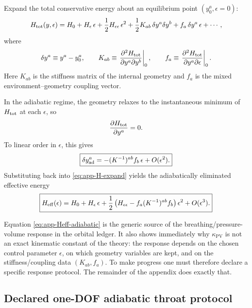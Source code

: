 \documentclass[11pt]{article}
\newcommand{\kPV}{\kappa_{\mathrm{PV}}}
\begin{document}
Expand the total conservative energy about an equilibrium point
\((y_0^a,\epsilon=0)\):
\begin{equation}
H_{\rm tot}(y,\epsilon)
=
H_0
+
H_\epsilon\,\epsilon
+
\frac12 H_{\epsilon\epsilon}\,\epsilon^2
+
\frac12 K_{ab}\,\delta y^a\delta y^b
+
f_a\,\delta y^a\,\epsilon
+\cdots,
\label{eq:app-H-expand}
\end{equation}
where
\begin{equation}
\delta y^a\equiv y^a-y_0^a,
\qquad
K_{ab}\equiv
\left.\frac{\partial^2 H_{\rm tot}}{\partial y^a\partial y^b}\right|_0,
\qquad
f_a\equiv
\left.\frac{\partial^2 H_{\rm tot}}{\partial y^a\partial \epsilon}\right|_0.
\label{eq:app-Kab-fa}
\end{equation}
Here \(K_{ab}\) is the stiffness matrix of the internal geometry and \(f_a\) is the
mixed environment--geometry coupling vector.

In the adiabatic regime, the geometry relaxes to the instantaneous minimum of
\(H_{\rm tot}\) at each \(\epsilon\), so
\begin{equation}
\frac{\partial H_{\rm tot}}{\partial y^a}=0.
\end{equation}
To linear order in \(\epsilon\), this gives
\begin{equation}
\boxed{
\delta y^a_{\rm ad}
=
-(K^{-1})^{ab}f_b\,\epsilon
+
O(\epsilon^2).
}
\label{eq:app-dy-adiabatic}
\end{equation}
Substituting back into \eqref{eq:app-H-expand} yields the adiabatically eliminated
effective energy
\begin{equation}
\boxed{
H_{\rm eff}(\epsilon)
=
H_0
+
H_\epsilon\,\epsilon
+
\frac12
\left(
H_{\epsilon\epsilon}
-
f_a(K^{-1})^{ab}f_b
\right)\epsilon^2
+
O(\epsilon^3).
}
\label{eq:app-Heff-adiabatic}
\end{equation}

Equation \eqref{eq:app-Heff-adiabatic} is the generic source of the breathing/pressure-volume
response in the orbital ledger. It also shows immediately why \(\kPV\) is not an exact
kinematic constant of the theory: the response depends on the chosen control parameter
\(\epsilon\), on which geometry variables are kept, and on the stiffness/coupling data
\((K_{ab},f_a)\). To make progress one must therefore declare a specific response
protocol. The remainder of the appendix does exactly that.

\subsection{Declared one-DOF adiabatic throat protocol}
\label{app:adiabatic-1dof}
\end{document}
